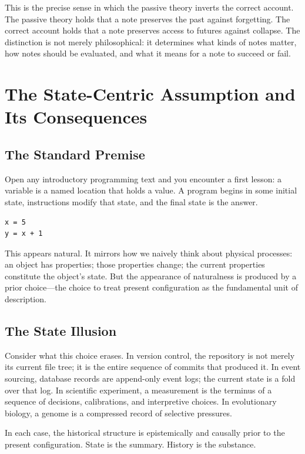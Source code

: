 \documentclass[12pt, a4paper, openany]{book}
\theoremstyle{plain}
\theoremstyle{definition}
\theoremstyle{remark}
\begin{document}
This is the precise sense in which the passive theory inverts the correct account.
The passive theory holds that a note preserves the past against forgetting. The
correct account holds that a note preserves access to futures against collapse.
The distinction is not merely philosophical: it determines what kinds of notes
matter, how notes should be evaluated, and what it means for a note to succeed
or fail.

\chapter{The State-Centric Assumption and Its Consequences}

\section{The Standard Premise}

Open any introductory programming text and you encounter a first lesson: a variable
is a named location that holds a value. A program begins in some initial state,
instructions modify that state, and the final state is the answer.

\begin{lstlisting}[style=rust, caption={The standard state-centric view}]
x = 5
y = x + 1
\end{lstlisting}

This appears natural. It mirrors how we naively think about physical processes: an
object has properties; those properties change; the current properties constitute
the object's state. But the appearance of naturalness is produced by a prior
choice---the choice to treat present configuration as the fundamental unit of
description.

\section{The State Illusion}

Consider what this choice erases. In version control, the repository is not merely
its current file tree; it is the entire sequence of commits that produced it. In
event sourcing, database records are append-only event logs; the current state is
a fold over that log. In scientific experiment, a measurement is the terminus of
a sequence of decisions, calibrations, and interpretive choices. In evolutionary
biology, a genome is a compressed record of selective pressures.

In each case, the historical structure is epistemically and causally prior to the
present configuration. State is the summary. History is the substance.
\end{document}
